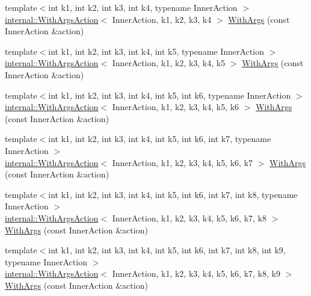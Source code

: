 \begin{DoxyCompactItemize}
\item 
{\footnotesize template$<$int k1, int k2, int k3, int k4, typename Inner\+Action $>$ }\\\hyperlink{classtesting_1_1internal_1_1WithArgsAction}{internal\+::\+With\+Args\+Action}$<$ Inner\+Action, k1, k2, k3, k4 $>$ \hyperlink{namespacetesting_a646a2e4ac7866ee8c486cb167ba9b45e}{With\+Args} (const Inner\+Action \&action)
\item 
{\footnotesize template$<$int k1, int k2, int k3, int k4, int k5, typename Inner\+Action $>$ }\\\hyperlink{classtesting_1_1internal_1_1WithArgsAction}{internal\+::\+With\+Args\+Action}$<$ Inner\+Action, k1, k2, k3, k4, k5 $>$ \hyperlink{namespacetesting_aa36b0c7216df96bdacf9fe491afd40bd}{With\+Args} (const Inner\+Action \&action)
\item 
{\footnotesize template$<$int k1, int k2, int k3, int k4, int k5, int k6, typename Inner\+Action $>$ }\\\hyperlink{classtesting_1_1internal_1_1WithArgsAction}{internal\+::\+With\+Args\+Action}$<$ Inner\+Action, k1, k2, k3, k4, k5, k6 $>$ \hyperlink{namespacetesting_a6df9cd27659e5943b5d3d77fc4f102e3}{With\+Args} (const Inner\+Action \&action)
\item 
{\footnotesize template$<$int k1, int k2, int k3, int k4, int k5, int k6, int k7, typename Inner\+Action $>$ }\\\hyperlink{classtesting_1_1internal_1_1WithArgsAction}{internal\+::\+With\+Args\+Action}$<$ Inner\+Action, k1, k2, k3, k4, k5, k6, k7 $>$ \hyperlink{namespacetesting_a04146a27847141c6942e9c67a85aadbe}{With\+Args} (const Inner\+Action \&action)
\item 
{\footnotesize template$<$int k1, int k2, int k3, int k4, int k5, int k6, int k7, int k8, typename Inner\+Action $>$ }\\\hyperlink{classtesting_1_1internal_1_1WithArgsAction}{internal\+::\+With\+Args\+Action}$<$ Inner\+Action, k1, k2, k3, k4, k5, k6, k7, k8 $>$ \hyperlink{namespacetesting_a16c131c0d58ae07d2e1ee6c7a44aaad1}{With\+Args} (const Inner\+Action \&action)
\item 
{\footnotesize template$<$int k1, int k2, int k3, int k4, int k5, int k6, int k7, int k8, int k9, typename Inner\+Action $>$ }\\\hyperlink{classtesting_1_1internal_1_1WithArgsAction}{internal\+::\+With\+Args\+Action}$<$ Inner\+Action, k1, k2, k3, k4, k5, k6, k7, k8, k9 $>$ \hyperlink{namespacetesting_a6aec78e6c201b150c78271e3f851414e}{With\+Args} (const Inner\+Action \&action)

\end{DoxyCompactItemize}
